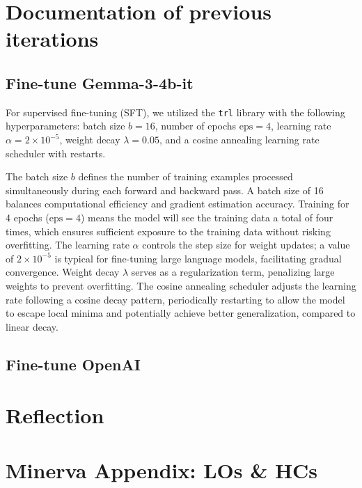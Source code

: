 \onecolumn
\section{Documentation of previous iterations} \label{app:previous-iterations}

\subsection{Fine-tune Gemma-3-4b-it} \label{app:gemma-finetune}

For supervised fine-tuning (SFT), we utilized the \texttt{trl} library with the following hyperparameters: batch size \( b = 16 \), number of epochs \( \text{eps} = 4 \), learning rate \( \alpha = 2 \times 10^{-5} \), weight decay \( \lambda = 0.05 \), and a cosine annealing learning rate scheduler with restarts.

The batch size \( b \) defines the number of training examples processed simultaneously during each forward and backward pass. A batch size of 16 balances computational efficiency and gradient estimation accuracy. Training for 4 epochs (\( \text{eps} = 4 \)) means the model will see the training data a total of four times, which ensures sufficient exposure to the training data without risking overfitting. The learning rate \( \alpha \) controls the step size for weight updates; a value of \( 2 \times 10^{-5} \) is typical for fine-tuning large language models, facilitating gradual convergence. Weight decay \( \lambda \) serves as a regularization term, penalizing large weights to prevent overfitting. The cosine annealing scheduler adjusts the learning rate following a cosine decay pattern, periodically restarting to allow the model to escape local minima and potentially achieve better generalization, compared to linear decay.

\subsection{Fine-tune OpenAI} \label{app:openai-finetune}


\section{Reflection} \label{sec:reflection}

\section{Minerva Appendix: LOs \& HCs} \label{sec:minerva}

